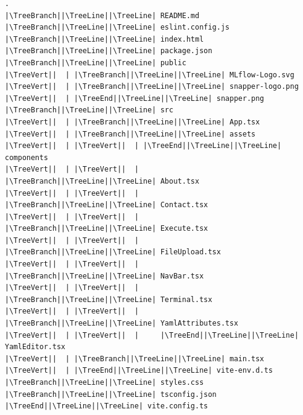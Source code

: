 \begin{verbatim}
.
|\TreeBranch||\TreeLine||\TreeLine| README.md
|\TreeBranch||\TreeLine||\TreeLine| eslint.config.js
|\TreeBranch||\TreeLine||\TreeLine| index.html
|\TreeBranch||\TreeLine||\TreeLine| package.json
|\TreeBranch||\TreeLine||\TreeLine| public
|\TreeVert||  | |\TreeBranch||\TreeLine||\TreeLine| MLflow-Logo.svg
|\TreeVert||  | |\TreeBranch||\TreeLine||\TreeLine| snapper-logo.png
|\TreeVert||  | |\TreeEnd||\TreeLine||\TreeLine| snapper.png
|\TreeBranch||\TreeLine||\TreeLine| src
|\TreeVert||  | |\TreeBranch||\TreeLine||\TreeLine| App.tsx
|\TreeVert||  | |\TreeBranch||\TreeLine||\TreeLine| assets
|\TreeVert||  | |\TreeVert||  | |\TreeEnd||\TreeLine||\TreeLine| components
|\TreeVert||  | |\TreeVert||  |     |\TreeBranch||\TreeLine||\TreeLine| About.tsx
|\TreeVert||  | |\TreeVert||  |     |\TreeBranch||\TreeLine||\TreeLine| Contact.tsx
|\TreeVert||  | |\TreeVert||  |     |\TreeBranch||\TreeLine||\TreeLine| Execute.tsx
|\TreeVert||  | |\TreeVert||  |     |\TreeBranch||\TreeLine||\TreeLine| FileUpload.tsx
|\TreeVert||  | |\TreeVert||  |     |\TreeBranch||\TreeLine||\TreeLine| NavBar.tsx
|\TreeVert||  | |\TreeVert||  |     |\TreeBranch||\TreeLine||\TreeLine| Terminal.tsx
|\TreeVert||  | |\TreeVert||  |     |\TreeBranch||\TreeLine||\TreeLine| YamlAttributes.tsx
|\TreeVert||  | |\TreeVert||  |     |\TreeEnd||\TreeLine||\TreeLine| YamlEditor.tsx
|\TreeVert||  | |\TreeBranch||\TreeLine||\TreeLine| main.tsx
|\TreeVert||  | |\TreeEnd||\TreeLine||\TreeLine| vite-env.d.ts
|\TreeBranch||\TreeLine||\TreeLine| styles.css
|\TreeBranch||\TreeLine||\TreeLine| tsconfig.json
|\TreeEnd||\TreeLine||\TreeLine| vite.config.ts
\end{verbatim}